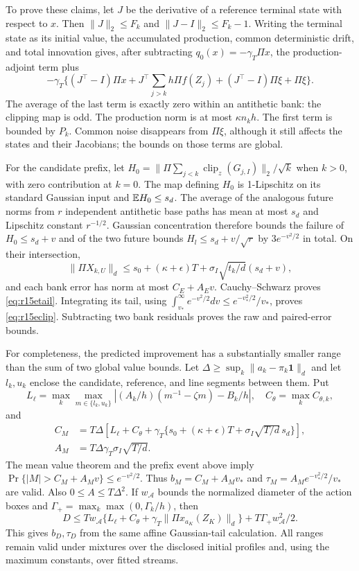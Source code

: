 To prove these claims, let $J$ be the derivative of a reference
terminal state with respect to $x$. Then
$\|J\|_2\leq F_k$ and $\|J-I\|_2\leq F_k-1$.
Writing the terminal state as its initial value, the accumulated
production, common deterministic drift, and total innovation gives,
after subtracting $q_0(x)=-\gamma_T\Pi x$, the production-adjoint
term plus
\[
 -\gamma_T\{(J^\top-I)\Pi x
           +J^\top\textstyle\sum_{j>k}h\Pi f(Z_j)
           +(J^\top-I)\Pi\xi+\Pi\xi\}.
\]
The average of the last term is exactly zero within an antithetic bank:
the clipping map is odd. The production norm is at most
$\kappa n_kh$. The first term is bounded by $P_k$.
Common noise disappears from $\Pi\xi$, although it still affects the
states and their Jacobians; the bounds on those terms are global.

For the candidate prefix, let
$H_0=\|\Pi\sum_{j<k}\operatorname{clip}_{z}(G_{j,I})\|_2/\sqrt k$
when $k>0$, with zero contribution at $k=0$. The map defining $H_0$
is 1-Lipschitz on its standard Gaussian input and
$\mathbb E H_0\leq s_d$. The average of the analogous future norms from
$r$ independent antithetic base paths has mean at most $s_d$ and
Lipschitz constant $r^{-1/2}$. Gaussian concentration therefore bounds
the failure of
$H_0\leq s_d+v$ and of the two future bounds
$H_l\leq s_d+v/\sqrt r$ by $3e^{-v^2/2}$ in total.
On their intersection,
\[
 \|\Pi X_{k,U}\|_d\leq s_0+(\kappa+\epsilon)T
                  +\sigma_I\sqrt{t_k/d}(s_d+v),
\]
and each bank error has norm at most $C_E+A_Ev$.
Cauchy--Schwarz proves \eqref{eq:r15etail}. Integrating its tail,
using $\int_{v_*}^{\infty}e^{-v^2/2}dv\leq e^{-v_*^2/2}/v_*$,
proves \eqref{eq:r15eclip}. Subtracting two bank residuals proves the
raw and paired-error bounds.

For completeness, the predicted improvement has a substantially
smaller range than the sum of two global value bounds. Let
$\Delta\geq\sup_k\|a_k-\pi_k\bm1\|_d$ and let $l_k,u_k$ enclose
the candidate, reference, and line segments between them. Put
\[
 L_\ell=\max_k\max_{m\in\{l_k,u_k\}}
       |(A_k/h)(m^{-1}-\zeta m)-B_k/h|,
 \quad C_\theta=\max_k C_{\theta,k},
\]
and
\begin{align*}
 C_M&=T\Delta\left[L_\ell+C_\theta+
       \gamma_T\{s_0+(\kappa+\epsilon)T+
                        \sigma_I\sqrt{T/d}\,s_d\}\right],\\
 A_M&=T\Delta\gamma_T\sigma_I\sqrt{T/d}.
\end{align*}
The mean value theorem and the prefix event above imply
$\Pr\{|M|>C_M+A_Mv\}\leq e^{-v^2/2}$.
Thus $b_M=C_M+A_Mv_*$ and
$\tau_M=A_Me^{-v_*^2/2}/v_*$ are valid. Also
$0\leq A\leq T\Delta^2$. If $w_{\mathcal A}$ bounds the normalized
diameter of the action boxes and
$\Gamma_+=\max_k\max(0,\Gamma_k/h)$, then
\[
 D\leq T w_{\mathcal A}
       \{L_\ell+C_\theta+\gamma_T\|\Pi x_{a_K}(Z_K)\|_d\}
                    +T\Gamma_+w_{\mathcal A}^2/2.
\]
This gives $b_D,\tau_D$ from the same affine Gaussian-tail calculation.
All ranges remain valid under mixtures over the disclosed initial
profiles and, using the maximum constants, over fitted streams.

